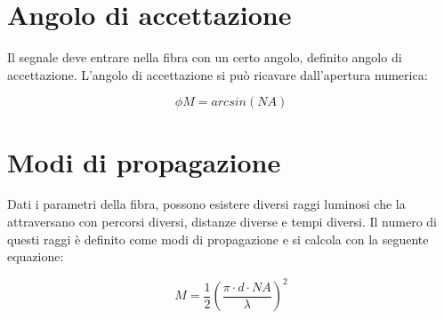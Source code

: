\documentclass{article}
\begin{document}
    \section{Angolo di accettazione}

    Il segnale deve entrare nella fibra con un certo angolo, definito angolo di accettazione. L'angolo di accettazione si
    può ricavare dall'apertura numerica:

    \begin{equation}
        \phi M = arcsin(NA)
    \end{equation}

    \section{Modi di propagazione}

    Dati i parametri della fibra, possono esistere diversi raggi luminosi che la attraversano con percorsi diversi, distanze diverse
    e tempi diversi. Il numero di questi raggi è definito come modi di propagazione e si calcola con la seguente equazione:

    \begin{equation}
        M = \frac{1}{2} (\frac{\pi \cdot d \cdot NA}{\lambda})^2
    \end{equation}
\end{document}
